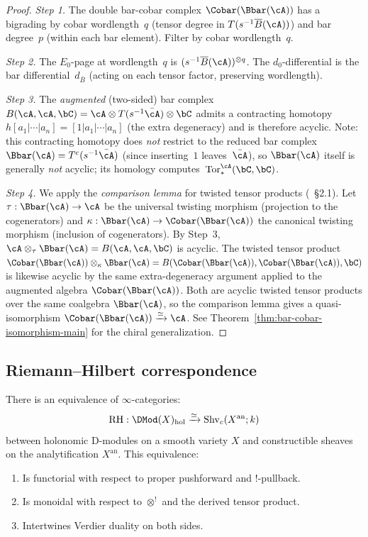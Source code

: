 \begin{proof}
\emph{Step 1.} The double bar-cobar complex $\Cobar(\Bbar(\cA))$ has a
bigrading by cobar wordlength~$q$ (tensor degree in $T(s^{-1}\overline{B}(\cA))$)
and bar degree~$p$ (within each bar element). Filter by cobar wordlength~$q$.

\emph{Step 2.} The $E_0$-page at wordlength~$q$ is $(s^{-1}\overline{B}(\cA))^{\otimes q}$.
The $d_0$-differential is the bar differential~$d_{\bar{B}}$ (acting on each tensor factor,
preserving wordlength).

\emph{Step 3.} The \emph{augmented} (two-sided) bar complex
$B(\cA, \cA, \bC) = \cA \otimes T(s^{-1}\bar{\cA}) \otimes \bC$
admits a contracting homotopy $h[a_1|\cdots|a_n] = [1|a_1|\cdots|a_n]$
(the extra degeneracy) and is therefore acyclic. Note: this contracting
homotopy does \emph{not} restrict to the reduced bar complex~$\Bbar(\cA) = T^c(s^{-1}\bar{\cA})$
(since inserting~$1$ leaves~$\bar{\cA}$), so $\Bbar(\cA)$ itself is generally
\emph{not} acyclic; its homology computes~$\mathrm{Tor}^{\cA}_*(\bC, \bC)$.

\emph{Step 4.} We apply the \emph{comparison lemma} for twisted tensor
products (\cite{LV12}~\S2.1). Let $\tau: \Bbar(\cA) \to \cA$
be the universal twisting morphism (projection to the cogenerators) and
$\kappa: \Bbar(\cA) \to \Cobar(\Bbar(\cA))$ the canonical twisting
morphism (inclusion of cogenerators). By Step~3,
$\cA \otimes_\tau \Bbar(\cA) = B(\cA, \cA, \bC)$ is acyclic.
The twisted tensor product
$\Cobar(\Bbar(\cA)) \otimes_\kappa \Bbar(\cA) = B(\Cobar(\Bbar(\cA)),
\Cobar(\Bbar(\cA)), \bC)$ is likewise acyclic by the same extra-degeneracy
argument applied to the augmented algebra $\Cobar(\Bbar(\cA))$.
Both are acyclic twisted tensor products over the same coalgebra
$\Bbar(\cA)$, so the comparison lemma gives a quasi-isomorphism
$\Cobar(\Bbar(\cA)) \xrightarrow{\simeq} \cA$.
See Theorem~\ref{thm:bar-cobar-isomorphism-main} for the chiral generalization.
\end{proof}

\subsection{Riemann--Hilbert correspondence}

\begin{theorem}
\label{thm:abstract-rh}
There is an equivalence of $\infty$-categories:
\[
\mathrm{RH}: \DMod(X)_{\mathrm{hol}} \xrightarrow{\simeq} \mathrm{Shv}_c(X^{\mathrm{an}}; k)
\]
between holonomic D-modules on a smooth variety $X$ and constructible sheaves
on the analytification $X^{\mathrm{an}}$. This equivalence:
\begin{enumerate}[label=(\roman*)]
\item Is functorial with respect to proper pushforward and $!$-pullback.
\item Is monoidal with respect to $\otimes^!$ and the derived tensor product.
\item Intertwines Verdier duality on both sides.
\end{enumerate}
\end{theorem}


